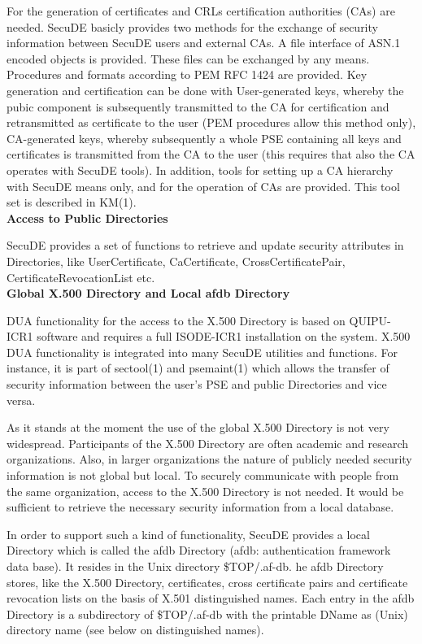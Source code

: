 For the generation of certificates and CRLs certification authorities 
(CAs) are needed.
SecuDE basicly provides two methods for the exchange of security
information between SecuDE users and external CAs.
\be
\m A file interface of ASN.1 encoded objects is provided. These
   files can be exchanged by any means.
\m Procedures and formats according to PEM RFC 1424 are provided.
\ee
Key generation and certification can be done with
\be
\m User-generated keys, whereby the pubic component is
   subsequently transmitted to the CA for certification and
   retransmitted as certificate to the user (PEM
   procedures allow this method only),
\m CA-generated keys, whereby subsequently a whole PSE
   containing all keys and certificates is transmitted from
   the CA to the user (this requires that also the CA operates
   with SecuDE tools).
\ee
In addition, tools for setting up a CA hierarchy with SecuDE means 
only, and for the operation of CAs are provided.
This tool set is described in KM(1).
\\ [1em]
{\large\bf Access to Public Directories}

SecuDE provides a set of functions to retrieve and update security 
attributes in Directories, like UserCertificate, CaCertificate, 
CrossCertificatePair, CertificateRevocationList etc.
\\ [1em]
{\bf Global X.500 Directory and Local afdb Directory}
 
DUA functionality for the access to the X.500 Directory is based on
QUIPU-ICR1 software and requires a full ISODE-ICR1 installation on the system. 
X.500 DUA functionality is integrated into many SecuDE utilities
and functions. For instance, it is part of sectool(1) and psemaint(1)
which allows the transfer of security information between the user's
PSE and public Directories and vice versa.

As it stands at the moment the use of the global X.500 Directory is not
very widespread. Participants of the X.500 Directory are often
academic and research organizations. Also, in larger organizations 
the nature of publicly needed security information is not global
but local. To securely communicate with people from the same organization,
access to the X.500 Directory is not needed. It would be sufficient
to retrieve the necessary security information from a local database.

In order to support such a kind of functionality, SecuDE provides a
local Directory which is called the afdb Directory (afdb: authentication
framework data base). It resides in the Unix directory \$TOP/.af-db.
he afdb Directory stores, like the X.500 Directory, certificates, 
cross certificate pairs and certificate revocation lists on the basis 
of X.501 distinguished names. Each entry in the afdb Directory is a 
subdirectory of \$TOP/.af-db with the printable DName as (Unix) directory 
name (see below on distinguished names).

